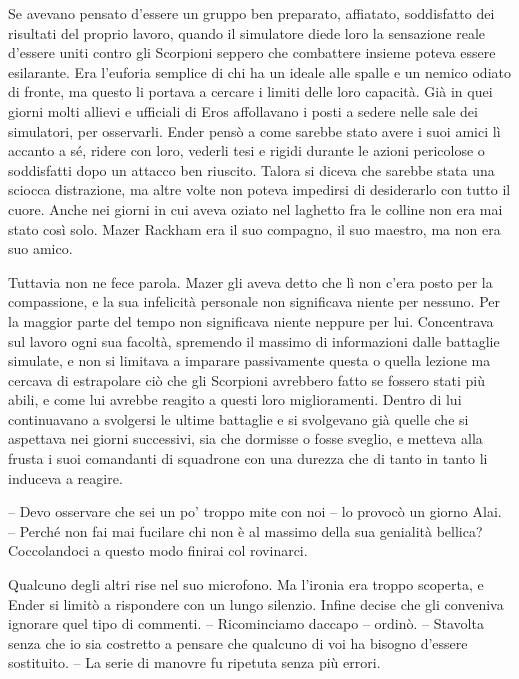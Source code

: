 {Se avevano pensato d'essere un gruppo ben preparato, affiatato,
	soddisfatto dei risultati del proprio lavoro, quando il simulatore diede
	loro la sensazione reale d'essere uniti contro gli Scorpioni seppero che
	combattere insieme poteva essere esilarante. Era l'euforia semplice di
	chi ha un ideale alle spalle e un nemico odiato di fronte, ma questo li
	portava a cercare i limiti delle loro capacità. Già in quei giorni molti
	allievi e ufficiali di Eros affollavano i posti a sedere nelle sale dei
	simulatori, per osservarli. Ender pensò a come sarebbe stato avere i
	suoi amici lì accanto a sé, ridere con loro, vederli tesi e rigidi
	durante le azioni pericolose o soddisfatti dopo un attacco ben riuscito.
	Talora si diceva che sarebbe stata una sciocca distrazione, ma altre
	volte non poteva impedirsi di desiderarlo con tutto il cuore. Anche nei
	giorni in cui aveva oziato nel laghetto fra le colline non era mai stato
	così solo. Mazer Rackham era il suo compagno, il suo maestro, ma non era
	suo amico.}

{Tuttavia non ne fece parola. Mazer gli aveva detto che lì non c'era
	posto per la compassione, e la sua infelicità personale non significava
	niente per nessuno. Per la maggior parte del tempo non significava
	niente neppure per lui. Concentrava sul lavoro ogni sua facoltà,
	spremendo il massimo di informazioni dalle battaglie simulate, e non si
	limitava a imparare passivamente questa o quella lezione ma cercava di
	estrapolare ciò che gli Scorpioni avrebbero fatto se fossero stati più
	abili, e come lui avrebbe reagito a questi loro miglioramenti. Dentro di
	lui continuavano a svolgersi le ultime battaglie e si svolgevano già
	quelle che si aspettava nei giorni successivi, sia che dormisse o fosse
	sveglio, e metteva alla frusta i suoi comandanti di squadrone con una
	durezza che di tanto in tanto li induceva a reagire.}

{-- Devo osservare che sei un po' troppo mite con noi -- lo provocò un
	giorno Alai. -- Perché non fai mai fucilare chi non è al massimo della
	sua genialità bellica? Coccolandoci a questo modo finirai col
	rovinarci.}

{Qualcuno degli altri rise nel suo microfono. Ma l'ironia era troppo
	scoperta, e Ender si limitò a rispondere con un lungo silenzio. Infine
	decise che gli conveniva ignorare quel tipo di commenti. -- Ricominciamo
	daccapo -- ordinò. -- Stavolta senza che io sia costretto a pensare che
	qualcuno di voi ha bisogno d'essere sostituito. -- La serie di manovre
	fu ripetuta senza più errori.}

